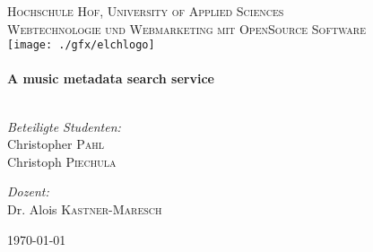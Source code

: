 \begin{titlepage}

\begin{center}

\textsc{\LARGE  Hochschule Hof, University of Applied Sciences}\\[1.5cm]
\textsc{\Large Webtechnologie und Webmarketing mit OpenSource Software}\\[0.5cm]

\texttt{[image: ./gfx/elchlogo]}\\[1cm]    
\HRule \\[0.4cm]
{ \huge \bfseries A music metadata search service}\\[0.4cm]

\HRule \\[1.5cm]

\begin{minipage}{0.4\textwidth}
\begin{flushleft} \large
\emph{Beteiligte Studenten:}\\
Christopher \textsc{Pahl}\\
Christoph \textsc{Piechula}
\end{flushleft}
\end{minipage}
\begin{minipage}{0.4\textwidth}
\begin{flushright} \large
\emph{Dozent:} \\
Dr. Alois \textsc{Kastner-Maresch}
\end{flushright}
\end{minipage}

\vfill

{\large \today}

\end{center}

\end{titlepage}
